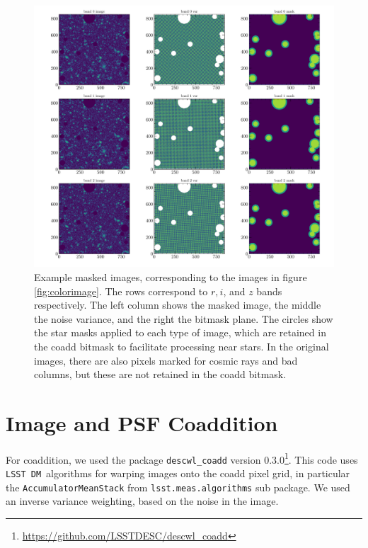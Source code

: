 \documentclass[twocolumn,twocolappendix,astrosym]{openjournal}
\newcommand{\dm}{\texttt{LSST DM}}
\begin{document}
\begin{figure}
    \includegraphics[width=\columnwidth]{example-masked-image.pdf}
    \caption{
        Example masked images, corresponding to the images in figure
        \ref{fig:colorimage}.  The rows correspond to $r, i$, and $z$ bands
        respectively.  The left column shows the masked image, the middle the
        noise variance, and the right the bitmask plane.  The circles show the
        star masks applied to each type of image, which are retained in the
        coadd bitmask to facilitate processing near stars.  In the original
        images, there are also pixels marked for cosmic rays and bad
        columns, but these are not retained in the coadd bitmask.
    }
\end{figure}



\section{Image and PSF Coaddition} \label{sec:coadding}

For coaddition, we used the package \texttt{descwl\_coadd} version
0.3.0\footnote{\url{https://github.com/LSSTDESC/descwl_coadd}}.  This code uses
\dm\ algorithms for warping images onto the coadd pixel grid, in particular the
\texttt{AccumulatorMeanStack} from \texttt{lsst.meas.algorithms} sub package.
We used an inverse variance weighting, based on the noise in the image.
\end{document}
